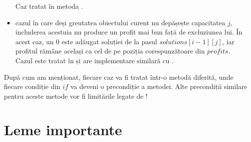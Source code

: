 \begin{sloppypar}
\begin{itemize}
\begin{Verbatim}[commandchars=\\\{\}]
\end{Verbatim}
        Caz tratat în metoda .
        \item cazul în care deși greutatea obiectului curent nu depășește capacitatea $j$, includerea acestuia nu produce un profit mai bun față de excluziunea lui. În acest caz, un 0 este adăugat soluției de la pasul $solutions[i - 1][j]$, iar profitul rămâne același ca cel de pe poziția corespunzătoare din $profits$. Cazul este tratat în  și are implementare similară cu .
    \end{itemize}
    După cum am menționat, fiecare caz va fi tratat într-o metodă diferită, unde fiecare condiție din $if$ va deveni o precondiție a metodei. Alte precondiții similare pentru aceste metode vor fi limitările legate de !

\section{Leme importante}


\end{sloppypar}
